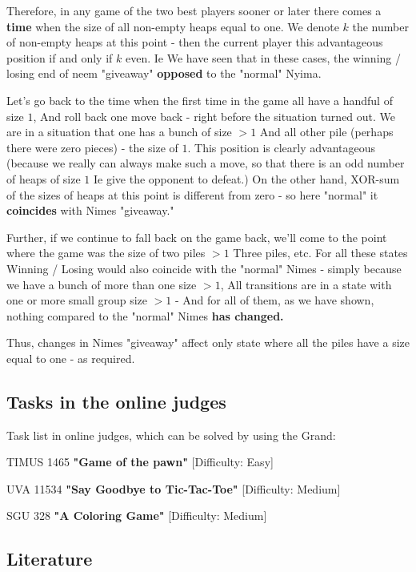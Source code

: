 Therefore, in any game of the two best players sooner or later there comes a \textbf{time} when the size of all non-empty heaps equal to one. We denote $k$ the number of non-empty heaps at this point - then the current player this advantageous position if and only if $k$ even. Ie We have seen that in these cases, the winning / losing end of neem "giveaway" \textbf{opposed} to the "normal" Nyima.

Let's go back to the time when the first time in the game all have a handful of size $1$, And roll back one move back - right before the situation turned out. We are in a situation that one has a bunch of size $> 1$ And all other pile (perhaps there were zero pieces) - the size of $1$. This position is clearly advantageous (because we really can always make such a move, so that there is an odd number of heaps of size $1$ Ie give the opponent to defeat.) On the other hand, XOR-sum of the sizes of heaps at this point is different from zero - so here "normal" it \textbf{coincides} with Nimes "giveaway."

Further, if we continue to fall back on the game back, we'll come to the point where the game was the size of two piles $> 1$ Three piles, etc. For all these states Winning / Losing would also coincide with the "normal" Nimes - simply because we have a bunch of more than one size $> 1$, All transitions are in a state with one or more small group size $> 1$ - And for all of them, as we have shown, nothing compared to the "normal" Nimes \textbf{has changed.}

Thus, changes in Nimes "giveaway" affect only state where all the piles have a size equal to one - as required.

\subsection{ Tasks in the online judges }

Task list in online judges, which can be solved by using the Grand:

TIMUS 1465 \textbf{"Game of the pawn"} [Difficulty: Easy]

UVA 11534 \textbf{"Say Goodbye to Tic-Tac-Toe"} [Difficulty: Medium]

SGU 328 \textbf{"A Coloring Game"} [Difficulty: Medium]

\subsection{ Literature }

